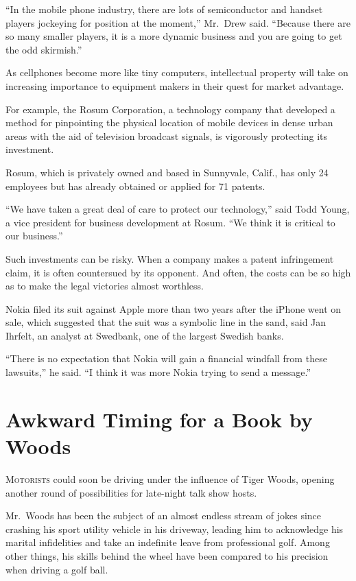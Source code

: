 ﻿\documentclass[12pt]{article}
\begin{document}
``In the mobile phone industry, there are lots of semiconductor and handset players jockeying for
position at the moment,'' Mr.~Drew said. ``Because there are so many smaller players, it is a more
dynamic business and you are going to get the odd skirmish.''

As cellphones become more like tiny computers, intellectual property will take on increasing
importance to equipment makers in their quest for market advantage.

For example, the Rosum Corporation, a technology company that developed a method for pinpointing the
physical location of mobile devices in dense urban areas with the aid of television broadcast
signals, is vigorously protecting its investment.

Rosum, which is privately owned and based in Sunnyvale, Calif., has only 24 employees but has
already obtained or applied for 71 patents.

``We have taken a great deal of care to protect our technology,'' said Todd Young, a vice president
for business development at Rosum. ``We think it is critical to our business.''

Such investments can be risky. When a company makes a patent infringement claim, it is often
countersued by its opponent. And often, the costs can be so high as to make the legal victories
almost worthless.

Nokia filed its suit against Apple more than two years after the iPhone went on sale, which
suggested that the suit was a symbolic line in the sand, said Jan Ihrfelt, an analyst at Swedbank,
one of the largest Swedish banks.

``There is no expectation that Nokia will gain a financial windfall from these lawsuits,'' he said.
``I think it was more Nokia trying to send a message.''

\section{Awkward Timing for a Book by Woods}

\lettrine{M}{otorists} could soon be driving under the influence of Tiger
Woods, opening another round of possibilities for late-night talk show hosts.

Mr.~Woods has been the subject of an almost endless stream of jokes since crashing his sport utility
vehicle in his driveway, leading him to acknowledge his marital infidelities and take an indefinite
leave from professional golf. Among other things, his skills behind the wheel have been compared to
his precision when driving a golf ball.
\end{document}
